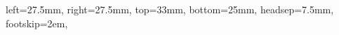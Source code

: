 {{   %
   left=27.5mm,        %
   right=27.5mm,       %
   top=33mm,         %
	bottom=25mm,      %
   headsep=7.5mm,     %
   footskip=2em,    %
}}
